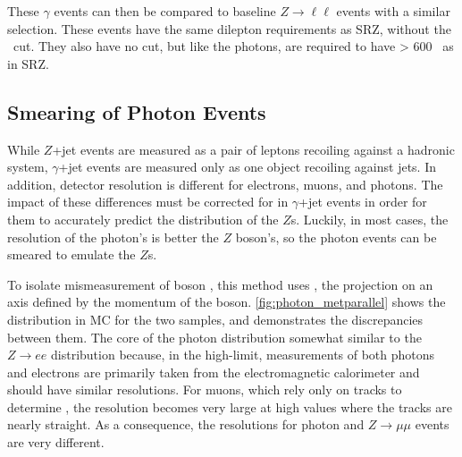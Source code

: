 These $\gamma$ events can then be compared to baseline $Z\rightarrow\ell\ell$ events with a similar selection. These events have the same dilepton requirements as SRZ, without the \mll~cut. They also have no \met cut, but like the photons, are required to have \HT > 600 \gev~as in SRZ.  

\subsection{Smearing of Photon Events}
\label{sec:photon_smearing}

While $Z$+jet events are measured as a pair of leptons recoiling against a hadronic system, $\gamma$+jet events are measured only as one  object recoiling against jets. In addition, detector resolution is different for electrons, muons, and photons. The impact of these differences must be corrected for in $\gamma$+jet events in order for them to accurately predict the \met distribution of the $Z$s. Luckily, in most cases, the resolution of the photon's \pt is better the $Z$ boson's, so the photon events can be smeared to emulate the $Z$s.  

To isolate mismeasurement of boson \pt, this method uses \metl, the \met projection on an axis defined by the momentum of the boson. \autoref{fig:photon_metparallel} shows the \metl distribution in \ac{MC} for the two samples, and demonstrates the discrepancies between them. The core of the photon distribution somewhat similar to the $Z\rightarrow ee$ distribution because, in the high-\pt limit, measurements of both photons and electrons are primarily taken from the electromagnetic calorimeter and should have similar resolutions. For muons, which rely only on tracks to determine \pt, the resolution becomes very large at high \pt values where the tracks are nearly straight. As a consequence, the resolutions for photon and $Z\rightarrow\mu\mu$ events are very different. 

